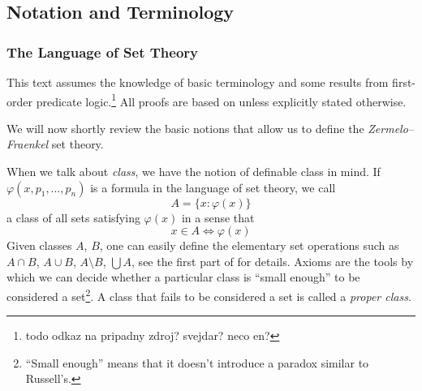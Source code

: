 \subsection{Notation and Terminology}
\subsubsection{The Language of Set Theory}
This text assumes the knowledge of basic terminology and some results from first-order predicate logic.\footnote{todo odkaz na pripadny zdroj? svejdar? neco en?} All proofs are based on \cite{JechBook} unless explicitly stated otherwise.

We will now shortly review the basic notions that allow us to define the \emph{Zermelo–Fraenkel} set theory.



When we talk about \emph{class}, we have the notion of definable class in mind. 
If $\varphi(x, p_1, \ldots, p_n)$ is a formula in the language of set theory, we call 
\begin{equation}
A = \{x : \varphi(x)\}
\end{equation}
a class of all sets satisfying $\varphi(x)$ in a sense that 
\begin{equation}
x \in A \iff \varphi(x)
\end{equation}
Given classes $A$, $B$, one can easily define the elementary set operations such as $A \cap B$, $A \cup B$, $A \setminus B$, $\bigcup A$, see the first part of \cite{JechBook} for details.
Axioms are the tools by which we can decide whether a particular class is ``small enough'' to be considered a set\footnote{``Small enough'' means that it doesn't introduce a paradox similar to Russell's.}. A class that fails to be considered a set is called a \emph{proper class}.

